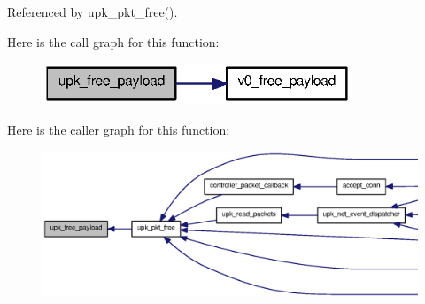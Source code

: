 Referenced by upk\_\-pkt\_\-free().



Here is the call graph for this function:\nopagebreak
\begin{figure}[H]
\begin{center}
\leavevmode
\includegraphics[width=262pt]{upk__protocol_8c_a4bf94cc8e7458fd891a91dde470be196_cgraph}
\end{center}
\end{figure}




Here is the caller graph for this function:
\nopagebreak
\begin{figure}[H]
\begin{center}
\leavevmode
\includegraphics[width=400pt]{upk__protocol_8c_a4bf94cc8e7458fd891a91dde470be196_icgraph}
\end{center}
\end{figure}



